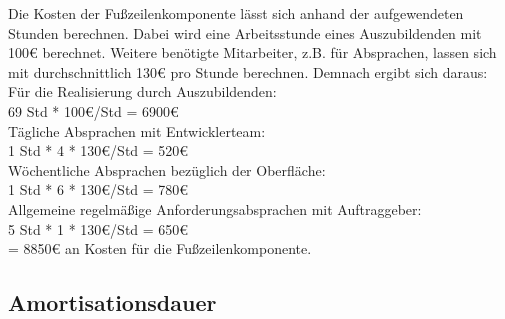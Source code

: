 Die Kosten der Fußzeilenkomponente lässt sich anhand der aufgewendeten Stunden berechnen.
Dabei wird eine Arbeitsstunde eines Auszubildenden mit 100€ berechnet. Weitere benötigte Mitarbeiter, z.B. für Absprachen, lassen sich mit durchschnittlich 130€ pro Stunde berechnen. 
Demnach ergibt sich daraus:\\
Für die Realisierung durch Auszubildenden: \\
69 Std * 100€/Std = 6900€ \\
Tägliche Absprachen mit Entwicklerteam: \\
1 Std * 4 * 130€/Std = 520€\\
Wöchentliche Absprachen bezüglich der Oberfläche:  \\
1 Std * 6 * 130€/Std = 780€\\
Allgemeine regelmäßige Anforderungsabsprachen mit Auftraggeber:  \\
5 Std * 1 *  130€/Std = 650€\\

= 8850€ an Kosten für die Fußzeilenkomponente.
\subsection{Amortisationsdauer}
\label{amortisationsdauer}


